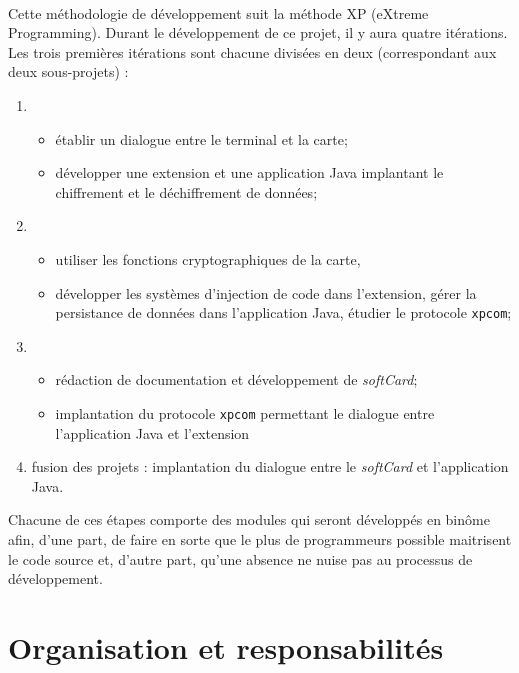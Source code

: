 \documentclass[a4paper,11pt,french]{article}
\begin{document}
\paragraph{}
Cette méthodologie de développement suit la méthode XP (eXtreme Programming). 
Durant le développement de ce projet, il y aura quatre itérations. Les
trois premières itérations sont chacune divisées en deux (correspondant
aux deux sous-projets) : 
\begin{enumerate}
 \item \begin{itemize}
            \item établir un dialogue entre le terminal et la carte;
            \item développer une extension et une application Java implantant
           le chiffrement et le déchiffrement de données; 
       \end{itemize}
 \item \begin{itemize}
            \item utiliser les fonctions cryptographiques de la carte, 
            \item développer les systèmes d'injection de code dans l'extension,
            gérer la persistance de données dans l'application Java, étudier
            le protocole \texttt{xpcom};
       \end{itemize}
 \item \begin{itemize}
            \item rédaction de documentation et développement de 
            \emph{softCard};
            \item implantation du protocole \texttt{xpcom} permettant
            le dialogue entre l'application Java et l'extension
       \end{itemize}
 \item fusion des projets : implantation du dialogue entre le \emph{softCard}
 et l'application Java.
\end{enumerate}
Chacune de ces étapes comporte des modules qui seront développés en binôme
afin, d'une part, de faire en sorte que le plus de programmeurs possible
maitrisent le code source et, d'autre part, qu'une absence ne nuise pas au
processus de développement.

\section{Organisation et responsabilités}
\end{document}
